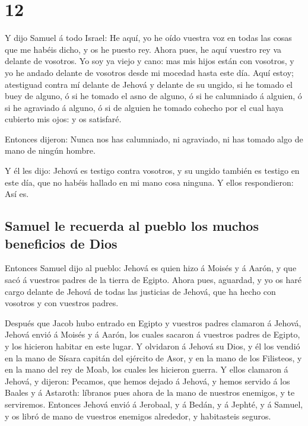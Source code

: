 \hypertarget{section-09-12}{%
\section{12}\label{section-09-12}}

 Y dijo Samuel á todo Israel: He aquí, yo he oído vuestra
voz en todas las cosas que me habéis dicho, y os he puesto rey.
 Ahora pues, he aquí vuestro rey va delante de vosotros.
Yo soy ya viejo y cano: mas mis hijos están con vosotros, y yo he andado
delante de vosotros desde mi mocedad hasta este día.  Aquí
estoy; atestiguad contra mí delante de Jehová y delante de su ungido, si
he tomado el buey de alguno, ó si he tomado el asno de alguno, ó si he
calumniado á alguien, ó si he agraviado á alguno, ó si de alguien he
tomado cohecho por el cual haya cubierto mis ojos: y os satisfaré.

 Entonces dijeron: Nunca nos has calumniado, ni agraviado,
ni has tomado algo de mano de ningún hombre.

 Y él les dijo: Jehová es testigo contra vosotros, y su
ungido también es testigo en este día, que no habéis hallado en mi mano
cosa ninguna. Y ellos respondieron: Así es.

\hypertarget{samuel-le-recuerda-al-pueblo-los-muchos-beneficios-de-dios}{%
\subsection{Samuel le recuerda al pueblo los muchos beneficios de
Dios}\label{samuel-le-recuerda-al-pueblo-los-muchos-beneficios-de-dios}}

 Entonces Samuel dijo al pueblo: Jehová es quien hizo á
Moisés y á Aarón, y que sacó á vuestros padres de la tierra de Egipto.
 Ahora pues, aguardad, y yo os haré cargo delante de
Jehová de todas las justicias de Jehová, que ha hecho con vosotros y con
vuestros padres.

 Después que Jacob hubo entrado en Egipto y vuestros
padres clamaron á Jehová, Jehová envió á Moisés y á Aarón, los cuales
sacaron á vuestros padres de Egipto, y los hicieron habitar en este
lugar.  Y olvidaron á Jehová su Dios, y él los vendió en
la mano de Sísara capitán del ejército de Asor, y en la mano de los
Filisteos, y en la mano del rey de Moab, los cuales les hicieron guerra.
 Y ellos clamaron á Jehová, y dijeron: Pecamos, que hemos
dejado á Jehová, y hemos servido á los Baales y á Astaroth: líbranos
pues ahora de la mano de nuestros enemigos, y te serviremos.
 Entonces Jehová envió á Jerobaal, y á Bedán, y á Jephté,
y á Samuel, y os libró de mano de vuestros enemigos alrededor, y
habitasteis seguros.

